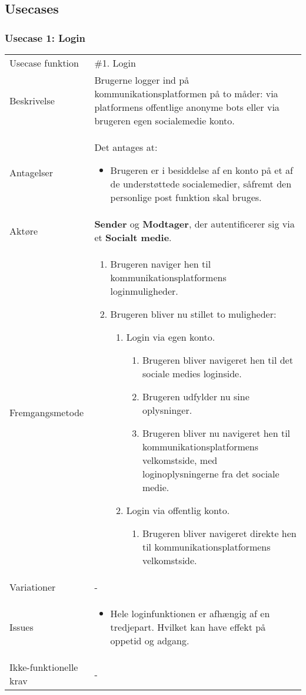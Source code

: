 \subsection{Usecases}
\subsubsection{Usecase 1: Login \label{Usecase1_Login}}
\begin{tabular}{@{}p{3.5cm}@{}p{13cm}@{}}
    Usecase funktion & 
    \#1. Login \\
    Beskrivelse & 
    Brugerne logger ind på kommunikationsplatformen på to måder: via platformens offentlige anonyme bots eller via brugeren egen socialemedie konto.\\
    Antagelser & 
    Det antages at:
    \begin{itemize}
        \item Brugeren er i besiddelse af en konto på et af de understøttede socialemedier, såfremt den personlige post funktion skal bruges.
    \end{itemize} \\
    Aktøre & 
    \textbf{Sender} og \textbf{Modtager}, der autentificerer sig via et \textbf{Socialt medie}.\\
    Fremgangsmetode &
    \begin{enumerate}
        \item Brugeren naviger hen til kommunikationsplatformens loginmuligheder.
        \item Brugeren bliver nu stillet to muligheder:
        \begin{enumerate}
            \item Login via egen konto.
            \begin{enumerate}
                \item Brugeren bliver navigeret hen til det sociale medies loginside.
                \item Brugeren udfylder nu sine oplysninger.
                \item Brugeren bliver nu navigeret hen til kommunikationsplatformens velkomstside, med loginoplysningerne fra det sociale medie.
            \end{enumerate}
            \item Login via offentlig konto.
                \begin{enumerate}
                    \item Brugeren bliver navigeret direkte hen til kommunikationsplatformens velkomstside.
                \end{enumerate}
        \end{enumerate}
    \end{enumerate} \\
    Variationer & 
    - \\
    Issues &
    \begin{itemize}
        \item Hele loginfunktionen er afhængig af en tredjepart. Hvilket kan have effekt på oppetid og adgang.
    \end{itemize} \\
    Ikke-funktionelle krav & 
    -
\end{tabular}
